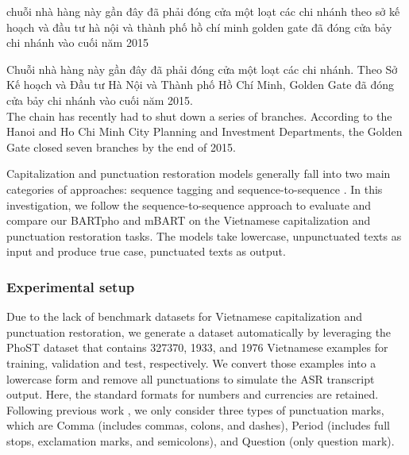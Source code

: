 \documentclass[a4paper]{article}
\begin{document}
\medskip

\begin{tcolorbox}[title=A transcript]
chuỗi nhà hàng này gần đây đã phải đóng cửa một loạt các chi nhánh theo sở kế hoạch và đầu tư hà nội và thành phố hồ chí minh golden gate đã đóng cửa bảy chi nhánh vào cuối năm 2015
\end{tcolorbox}

\begin{tcolorbox}[title=The transcript enriched with capitalization and punctuation restoration \& its English translation]
Chuỗi nhà hàng này gần đây đã phải đóng cửa một loạt các chi nhánh. Theo Sở Kế hoạch và Đầu tư Hà Nội và Thành phố Hồ Chí Minh, Golden Gate đã đóng cửa bảy chi nhánh vào cuối năm 2015. \\
The chain has recently had to shut down a series of branches. According to the Hanoi and Ho Chi Minh City Planning and Investment Departments, the Golden Gate closed seven branches by the end of 2015.
\end{tcolorbox}

Capitalization and punctuation restoration models generally fall into two main categories of approaches: sequence tagging \cite{NguyenNTDM20,huang21g_interspeech, shi21_interspeech} and sequence-to-sequence \cite{NGUYEN20212020BDP0005,capu_binhnguyen}. In this investigation, we follow the sequence-to-sequence approach to evaluate and compare our BARTpho and mBART on the Vietnamese capitalization and punctuation restoration tasks. The models take lowercase, unpunctuated texts as input and produce true case, punctuated texts as output.



\subsubsection{Experimental setup}

Due to the lack of benchmark datasets for Vietnamese capitalization and punctuation restoration, we generate a dataset automatically by leveraging the PhoST dataset  \cite{phost} that contains 327370, 1933, and 1976  Vietnamese examples for training, validation and test, respectively. 
We convert those examples into a lowercase form and remove all punctuations to simulate the ASR transcript output. Here, the standard formats for numbers and currencies are retained. 
Following previous work \cite{NguyenNTDM20,NGUYEN20212020BDP0005}, we only consider three types of punctuation marks, which are Comma (includes commas, colons, and dashes), Period (includes full stops, exclamation marks, and semicolons), and Question (only question mark). 
\end{document}
